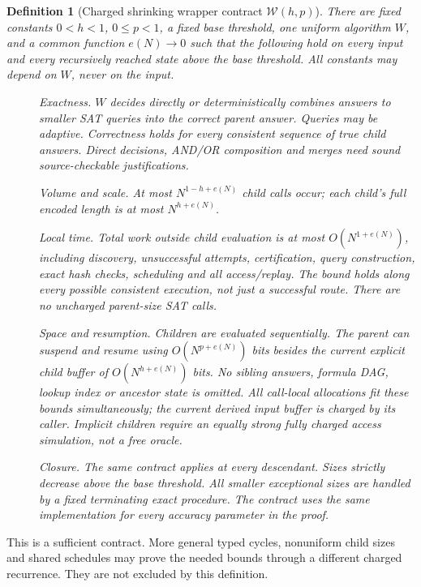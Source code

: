 \documentclass[11pt]{article}
\newtheorem{definition}{Definition}
\begin{document}
\begin{definition}[Charged shrinking wrapper contract $\mathcal W(h,p)$]
There are fixed constants $0<h<1$, $0\le p<1$, a fixed base threshold,
one uniform algorithm $W$, and a common function $e(N)\to0$ such that the
following hold on every input and every recursively reached state above
the base threshold. All constants may depend on $W$, never on the input.
\begin{description}
\item[] \emph{Exactness.} $W$ decides directly or deterministically combines
answers to smaller SAT queries into the correct parent answer. Queries
may be adaptive. Correctness holds for every consistent sequence of true
child answers. Direct decisions, AND/OR composition and merges need
sound source-checkable justifications.
\item[] \emph{Volume and scale.} At most $N^{1-h+e(N)}$ child calls occur;
each child's full encoded length is at most $N^{h+e(N)}$.
\item[] \emph{Local time.} Total work outside child evaluation is at most
$O(N^{1+e(N)})$, including discovery, unsuccessful attempts, certification,
query construction, exact hash checks, scheduling and all access/replay.
The bound holds along every possible consistent execution, not just a
successful route. There are no uncharged parent-size SAT calls.
\item[] \emph{Space and resumption.} Children are evaluated sequentially.
The parent can suspend and resume using $O(N^{p+e(N)})$ bits besides the
current explicit child buffer of $O(N^{h+e(N)})$ bits. No sibling answers,
formula DAG, lookup index or ancestor state is omitted. All call-local
allocations fit these bounds simultaneously; the current derived input
buffer is charged by its caller. Implicit children require an equally
strong fully charged access simulation, not a free oracle.
\item[] \emph{Closure.} The same contract applies at every descendant.
Sizes strictly decrease above the base threshold. All smaller exceptional
sizes are handled by a fixed terminating exact procedure. The contract
uses the same implementation for every accuracy parameter in the proof.
\end{description}
\end{definition}

This is a sufficient contract. More general typed cycles, nonuniform
child sizes and shared schedules may prove the needed bounds through a
different charged recurrence. They are not excluded by this definition.
\end{document}
